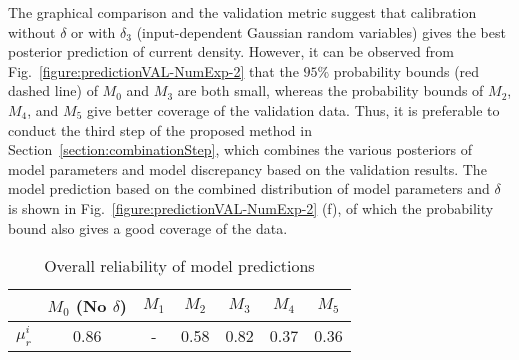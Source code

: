 \documentclass[preprint,review,12pt,3p]{elsarticle}
\begin{document}
The graphical comparison and the validation metric suggest that calibration without $\delta$ or with $\delta_3$ (input-dependent Gaussian random variables) gives the best posterior prediction of current density. However, it can be observed from Fig.~\ref{figure:predictionVAL-NumExp-2} that the $95\%$ probability bounds (red dashed line) of $M_0$ and $M_3$ are both small, whereas the probability bounds of $M_2$, $M_4$, and $M_5$ give better coverage of the validation data. Thus, it is preferable to conduct the third step of the proposed method in Section~\ref{section:combinationStep}, which combines the various posteriors of model parameters and model discrepancy based on the validation results. The model prediction based on the combined distribution of model parameters and $\delta$ is shown in Fig.~\ref{figure:predictionVAL-NumExp-2} (f), of which the probability bound also gives a good coverage of the data.

\begin{table}[h!]
\caption{Overall reliability of model predictions}
\label{table:overallRM-NumExp-2}
\begin{center}
\begin{tabular}{ccccccc}
\hline
& $M_{0}$ (No $\delta$) & $M_1$ & $M_2$ & $M_3$ & $M_4$ & $M_5$ \\
\hline
$\mu_r^i$ & 0.86 & - & 0.58 & 0.82 & 0.37 & 0.36 \\
\hline
\end{tabular}
\end{center}
\end{table}


\end{document}

